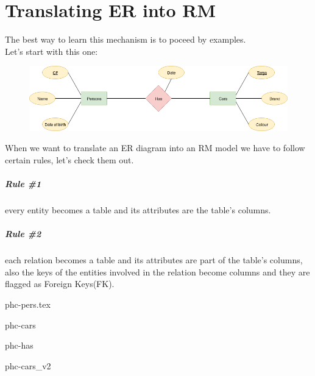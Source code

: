 \documentclass[class=book, crop=false, oneside]{standalone}
\begin{document}
\chapter*{Translating ER into RM}
The best way to learn this mechanism is to poceed by examples.\\
Let's start with this one:

\begin{figure}[H]
	\centering
	\includegraphics[width=.9\textwidth,keepaspectratio]{diagram1.png}
	\caption{}
	\label{diagram1}
\end{figure}

When we want to translate an ER diagram into an RM model we have to follow certain rules, let's check them out.
\paragraph*{Rule \#1} every entity becomes a table and its attributes are the table's columns.
\paragraph*{Rule \#2} each relation becomes a table and its attributes are part of the table's columns, also the keys of the entities involved in the relation become columns and they are flagged as Foreign Keys(FK).

\vskip 20pt

\begin{minipage}{0.45\textwidth}

	\begin{table}[H]
		\centering
		{phc-pers.tex}
	\end{table}

\end{minipage}
\hspace{.1\textwidth}
\begin{minipage}{.45\textwidth}

	\begin{table}[H]
		\centering
		{phc-cars}
	\end{table}

\end{minipage}

\vskip 20pt
\begin{minipage}{\textwidth}

	\begin{table}[H]
		\centering
		{phc-has}
	\end{table}

	\end{minipage}
	
	\vskip 20pt

	\begin{minipage}{\textwidth}

		\begin{table}[H]
			\centering
			{phc-cars_v2}
		\end{table}

	\end{minipage}
\end{document}
